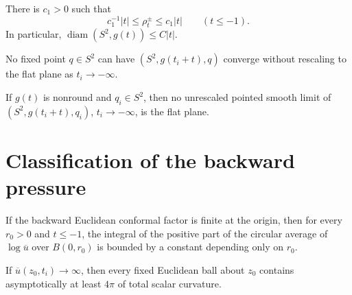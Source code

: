 \begin{lemma}
\label{lem:chow-iv-radius-linear-time}
There is \(c_1>0\) such that
\[
 c_1^{-1}|t|\le\rho_t^\pm\le c_1|t|\qquad(t\le-1).
\]
In particular, \(\operatorname{diam}(S^2,g(t))\le C|t|\).
\end{lemma}

\begin{proposition}
\label{prop:chow-iv-plane-not-backward-pointwise-limit}
No fixed point \(q\in S^2\) can have
\((S^2,g(t_i+t),q)\) converge without rescaling to the flat plane as
\(t_i\to-\infty\).
\end{proposition}

\begin{lemma}
\label{lem:chow-iv-nonround-no-plane-limit}
If \(g(t)\) is nonround and \(q_i\in S^2\), then no unrescaled pointed
smooth limit of \((S^2,g(t_i+t),q_i)\), \(t_i\to-\infty\), is the flat
plane.
\end{lemma}

\section{Classification of the backward pressure}

\begin{lemma}
\label{lem:chow-iv-positive-circular-average-bound}
If the backward Euclidean conformal factor is finite at the origin, then for
every \(r_0>0\) and \(t\le-1\), the integral of the positive part of the
circular average of \(\log\overline u\) over \(B(0,r_0)\) is bounded by a
constant depending only on \(r_0\).
\end{lemma}

\begin{lemma}
\label{lem:chow-iv-unbounded-conformal-factor-curvature-concentration}
If \(\overline u(z_0,t_i)\to\infty\), then every fixed Euclidean ball about
\(z_0\) contains asymptotically at least \(4\pi\) of total scalar curvature.
\end{lemma}

